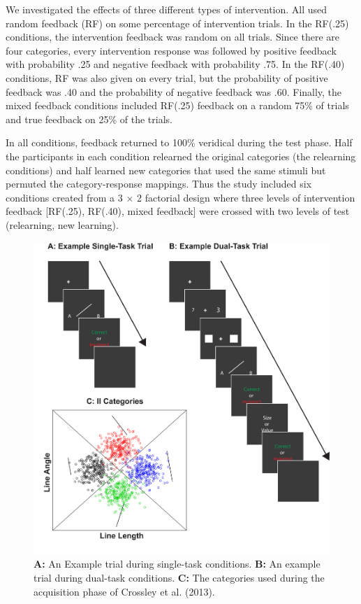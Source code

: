 \documentclass[apacite,draftfirst,jou]{apa6}
\begin{document}
We investigated the effects of three different types of intervention. All used
random feedback (RF) on some percentage of intervention trials. In the RF(.25)
conditions, the intervention feedback was random on all trials. Since there are
four categories, every intervention response was followed by positive feedback
with probability .25 and negative feedback with probability .75. In the RF(.40)
conditions, RF was also given on every trial, but the probability of positive
feedback was .40 and the probability of negative feedback was .60. Finally, the
mixed feedback conditions included RF(.25) feedback on a random 75\% of trials
and true feedback on 25\% of the trials.

In all conditions, feedback returned to 100\% veridical during the test phase.
Half the participants in each condition relearned the original categories (the
relearning conditions) and half learned new categories that used the same
stimuli but permuted the category-response mappings. Thus the study included six
conditions created from a 3 $\times$ 2 factorial design where three levels of
intervention feedback [RF(.25), RF(.40), mixed feedback] were crossed with two
levels of test (relearning, new learning).

\begin{figure}[t] \centering
  \includegraphics[width=1.0\textwidth]{../figures/fig_trials.pdf}
  \caption{ \textbf{A:} An Example trial during single-task conditions.
    \textbf{B:} An example trial during dual-task conditions. \textbf{C:} The
    categories used during the acquisition phase of Crossley et al. (2013). }
  \label{fig:test_cats}
\end{figure}
\end{document}
